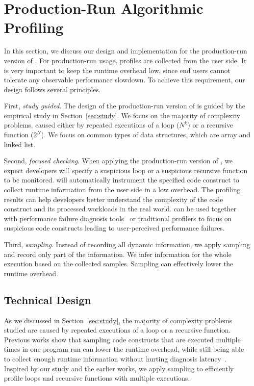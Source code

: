 \section{Production-Run Algorithmic Profiling}
\label{sec:online}

In this section, we discuss our design and 
implementation for the production-run version of \Tool. 
For production-run usage, profiles are collected from the user side.
It is very important to keep the runtime overhead low, since
end users cannot tolerate any observable performance slowdown.
To achieve this requirement,
our design follows several principles. 

First, \textit{study guided}. 
The design of the production-run version of \Tool
is guided by the empirical study in Section~\ref{sec:study}.
We focus on the majority of complexity problems, 
caused either by repeated executions of a loop ($N^k$)
or a recursive function ($2^N$).
We focus on common types of data structures, which are array and linked list.

Second, \textit{focused checking}.
When applying the production-run version of \Tool, 
we expect developers will specify a suspicious loop or a suspicious recursive function
to be monitored. 
\Tool will automatically instrument the specified code construct 
to collect runtime information from the user side in a low overhead. 
The profiling results can help developers better understand the complexity of the code construct 
and its processed workloads in the real world.
\Tool can be used together with performance failure 
diagnosis tools~\cite{SongOOPSLA2014} 
or traditional profilers to
focus on suspicious code constructs leading 
to user-perceived performance failures.

Third, \textit{sampling}.
Instead of recording all dynamic information, 
we apply sampling and record only part of the information. 
We infer information for the whole execution based on the collected samples. 
Sampling can effectively lower the runtime overhead. 


\subsection{Technical Design}
As we discussed in Section~\ref{sec:study}, 
the majority of complexity problems studied are caused 
by repeated executions of a loop or a recursive function. 
Previous works show that sampling code constructs that are executed 
multiple times in one program run can lower the runtime overhead, 
while still being able to collect enough runtime information 
without hurting diagnosis latency~\cite{SongOOPSLA2014,ldoctor}. 
Inspired by our study and the earlier works, 
we apply sampling to efficiently profile loops 
and recursive functions with multiple executions. 

